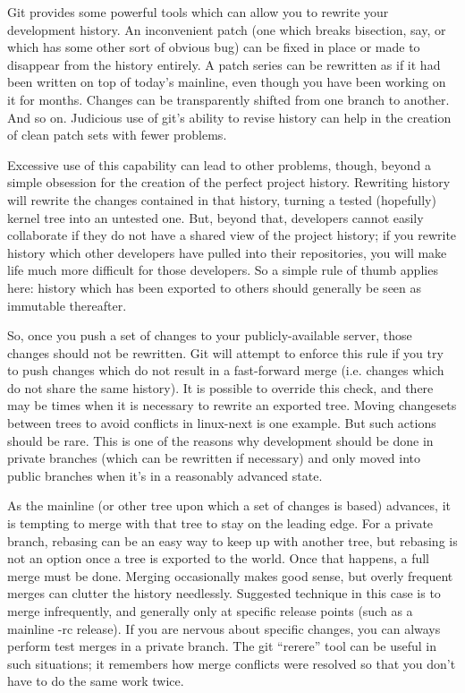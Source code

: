 \documentclass[a4paper,8pt,english]{sphinxmanual}
\begin{document}
Git provides some powerful tools which can allow you to rewrite your
development history.  An inconvenient patch (one which breaks bisection,
say, or which has some other sort of obvious bug) can be fixed in place or
made to disappear from the history entirely.  A patch series can be
rewritten as if it had been written on top of today's mainline, even though
you have been working on it for months.  Changes can be transparently
shifted from one branch to another.  And so on.  Judicious use of git's
ability to revise history can help in the creation of clean patch sets with
fewer problems.

Excessive use of this capability can lead to other problems, though, beyond
a simple obsession for the creation of the perfect project history.
Rewriting history will rewrite the changes contained in that history,
turning a tested (hopefully) kernel tree into an untested one.  But, beyond
that, developers cannot easily collaborate if they do not have a shared
view of the project history; if you rewrite history which other developers
have pulled into their repositories, you will make life much more difficult
for those developers.  So a simple rule of thumb applies here: history
which has been exported to others should generally be seen as immutable
thereafter.

So, once you push a set of changes to your publicly-available server, those
changes should not be rewritten.  Git will attempt to enforce this rule if
you try to push changes which do not result in a fast-forward merge
(i.e. changes which do not share the same history).  It is possible to
override this check, and there may be times when it is necessary to rewrite
an exported tree.  Moving changesets between trees to avoid conflicts in
linux-next is one example.  But such actions should be rare.  This is one
of the reasons why development should be done in private branches (which
can be rewritten if necessary) and only moved into public branches when
it's in a reasonably advanced state.

As the mainline (or other tree upon which a set of changes is based)
advances, it is tempting to merge with that tree to stay on the leading
edge.  For a private branch, rebasing can be an easy way to keep up with
another tree, but rebasing is not an option once a tree is exported to the
world.  Once that happens, a full merge must be done.  Merging occasionally
makes good sense, but overly frequent merges can clutter the history
needlessly.  Suggested technique in this case is to merge infrequently, and
generally only at specific release points (such as a mainline -rc
release).  If you are nervous about specific changes, you can always
perform test merges in a private branch.  The git ``rerere'' tool can be
useful in such situations; it remembers how merge conflicts were resolved
so that you don't have to do the same work twice.
\end{document}
